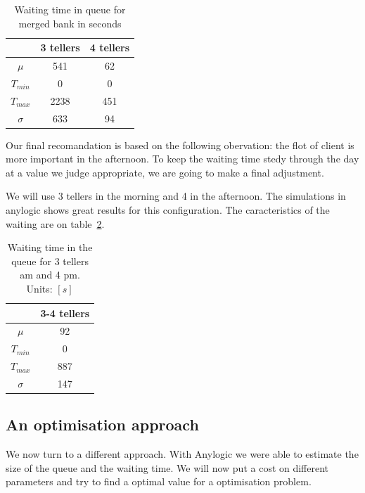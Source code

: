 \documentclass[12pt,a4paper,notitlepage]{report}
\begin{document}
\begin{table}[h]
\centering
\begin{tabular}{|c|c|c|}
 \hline 
  & 3 tellers & 4 tellers \\ 
 \hline 
 $\mu$ & 541  & 62 \\ 
 \hline 
 $T_{min}$ & 0 & 0 \\ 
 \hline 
 $T_{max}$ & 2238 & 451 \\ 
 \hline 
 $\sigma$ & 633 & 94 \\ 
 \hline 
 \end{tabular}  
\caption{Waiting time in queue for merged bank in seconds}
\label{any34}
\end{table}




Our final recomandation is based on the following obervation: the flot of client is more important in the afternoon. To keep the waiting time stedy through the day  at a value we judge appropriate, we are going to make a final adjustment.

We will use 3 tellers in the morning and 4 in the afternoon. The simulations in anylogic shows great results for this configuration. The caracteristics of the waiting are on table~\ref{any3et4}.
\begin{table}[h]
\centering
\begin{tabular}{|c|c|}
\hline
 & 3-4 tellers \\
\hline 
$\mu$ & 92 \\ 
\hline 
$T_{min}$ & 0 \\ 
\hline 
$T_{max}$ & 887 \\ 
\hline 
$\sigma$ & 147 \\ 
\hline 
\end{tabular} 
\caption{Waiting time in the queue for 3 tellers am and 4 pm. Units: $[s]$}
\label{any3et4}
\end{table}

\subsection*{An optimisation approach}

We now turn to a different approach. With Anylogic we were able to estimate the size of the queue and the waiting time. We will now put a cost on different parameters and try to find a optimal value for a optimisation problem.

\end{document}
